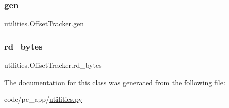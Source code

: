 \subsubsection{\texorpdfstring{gen}{gen}}
{\footnotesize\ttfamily utilities.\+Offset\+Tracker.\+gen}

\mbox{\label{classutilities_1_1OffsetTracker_ac6ebf15df031eb10591c8e8a8d8e0168}} 
\subsubsection{\texorpdfstring{rd\+\_\+bytes}{rd\_bytes}}
{\footnotesize\ttfamily utilities.\+Offset\+Tracker.\+rd\+\_\+bytes}



The documentation for this class was generated from the following file\+:\begin{DoxyCompactItemize}
\item 
code/pc\+\_\+app/\hyperlink{utilities_8py}{utilities.\+py}\end{DoxyCompactItemize}

